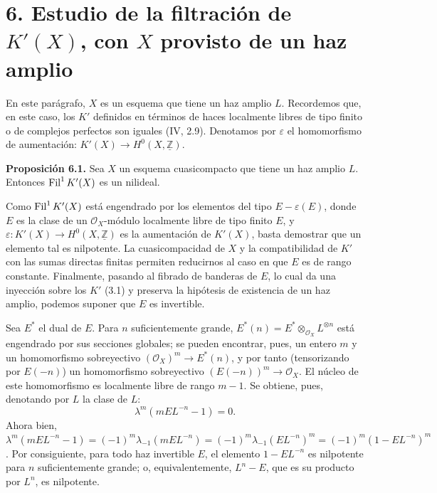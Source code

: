 \providecommand{\sisi}[2]{#2}

\section*{6. Estudio de la filtración de \texorpdfstring{$K'(X)$}{K'(X)}, con $X$ provisto de un haz amplio}

En este parágrafo, $X$ es un esquema que tiene un haz amplio $L$. Recordemos que, en este caso, los $K'$ definidos en términos de haces localmente libres de tipo finito o de complejos perfectos son iguales (IV, 2.9). Denotamos por $\varepsilon$ el homomorfismo de aumentación: $K'(X)\longrightarrow H^0(X,\underline{\mathbb Z})$.

\textbf{Proposición 6.1.} Sea $X$ un esquema cuasicompacto que tiene un haz amplio $L$. Entonces $\operatorname{Fil}^1K'(X)$ es un nilideal.

Como $\operatorname{Fil}^1K'(X)$ está engendrado por los elementos del tipo $E-\varepsilon(E)$, donde $E$ es la clase de un $\mathcal O_X$-módulo localmente libre de tipo finito $E$, y $\varepsilon:K'(X)\to H^0(X,\underline{\mathbb Z})$ es la aumentación de $K'(X)$, basta demostrar que un elemento tal es nilpotente. La cuasicompacidad de $X$ y la compatibilidad de $K'$ con las sumas directas finitas permiten reducirnos al caso en que $E$ es de rango constante. Finalmente, pasando al fibrado de banderas de $E$, lo cual da una inyección sobre los $K'$ (3.1) y preserva la hipótesis de existencia de un haz amplio, podemos suponer que $E$ es invertible.

Sea $E^*$ el dual de $E$. Para $n$ suficientemente grande, $E^*(n)=E^*\otimes_{\mathcal O_X}L^{\otimes n}$ está engendrado por sus secciones globales; se pueden encontrar, pues, un entero $m$ y un homomorfismo sobreyectivo $(\mathcal O_X)^m\longrightarrow E^*(n)$, y por tanto (tensorizando por $E(-n)$) un homomorfismo sobreyectivo $(E(-n))^m\longrightarrow\mathcal O_X$. El núcleo de este homomorfismo es localmente libre de rango $m-1$. Se obtiene, pues, denotando por $L$ la clase de $L$:
\[
  \lambda^m(mEL^{-n}-1)=0 .
\]
Ahora bien, $\lambda^m(mEL^{-n}-1)=(-1)^m\lambda_{-1}(mEL^{-n})=(-1)^m\lambda_{-1}(EL^{-n})^m=(-1)^m(1-EL^{-n})^m$. Por consiguiente, para todo haz invertible $E$, el elemento $1-EL^{-n}$ es nilpotente para $n$ suficientemente grande; o, equivalentemente, $L^n-E$, que es su producto por $L^n$, es nilpotente.

